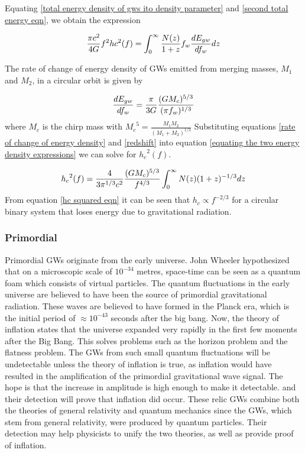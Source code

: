 \documentclass[12pt]{article}
\begin{document}
Equating \ref{total energy density of gws ito density parameter} and \ref{second total energy eqn}, we obtain the expression

\begin{equation}{\label{equating the two energy density expressions}}
\frac{\pi c^2}{4G}f^2hc^2(f)=\int_{0}^{\infty}\frac{N(z)}{1+z}f_w\frac{dE_{gw}}{df_w}dz
\end{equation}

The rate of change of energy density of GWs emitted from merging masses, $M_1$ and $M_2$, in a circular orbit is given by

\begin{equation}{\label{rate of change of energy density}}
\frac{dE_{gw}}{df_w}=\frac{\pi}{3G}\frac{(GM_c)^{5/3}}{(\pi f_w)^{1/3}}
\end{equation}
where $M_c$ is the chirp mass with ${M_c}^5=\frac{M_1 M_2}{(M_1 +M_2)^{1/3}}$ 
Substituting equations \ref{rate of change of energy density} and \ref{redshift} into equation \ref{equating the two energy density expressions} we can solve for ${h_c}^2(f)$.

\begin{equation}{\label{hc squared eqn}}
{h_c}^2(f)=\frac{4}{3\pi^{1/3}c^2}\frac{(GM_c)^{5/3}}{f^{4/3}}\int_{0}^{\infty}N(z)(1+z)^{-1/3}dz
\end{equation}
From equation \ref{hc squared eqn} it can be seen that $h_c \propto f^{-2/3}$ for a circular binary system that loses energy due to gravitational radiation. 
\subsubsection{Primordial}\label{prim GW}

\noindent Primordial GWs originate from the early universe. John Wheeler hypothesized that on a microscopic scale of $10^{-34}$ metres, space-time can be seen as a quantum foam which consists of virtual particles. The quantum fluctuations in the early universe are believed to have been the source of primordial gravitational radiation. These waves are believed to have formed in the Planck era, which is the initial period of $\approx 10^{-43}$ seconds after the big bang. Now, the theory of inflation states that the universe expanded very rapidly in the first few moments after the Big Bang. This solves problems such as the horizon problem and the flatness problem. The GWs from such small quantum fluctuations will be undetectable unless the theory of inflation is true, as inflation would have resulted in the amplification of the primordial gravitational wave signal. The hope is that the increase in amplitude is high enough to make it detectable. and their detection will prove that inflation did occur. These relic GWs combine both the theories of general relativity and quantum mechanics since the GWs, which stem from general relativity, were produced by quantum particles. Their detection may help physicists to unify the two theories, as well as provide proof of inflation. 
 
\end{document}
